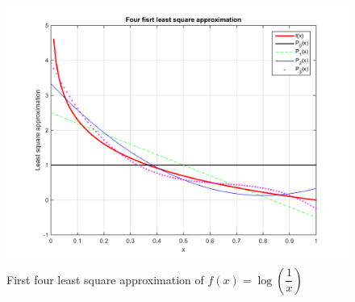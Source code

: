 \documentclass[14pt,a4paper]{article}
\begin{document}
\begin{enumerate}
\begin{figure}[htp]
		\centering
		\includegraphics[scale=0.7]{hw3_34.png}
		\caption{First four least square approximation of $f(x) = \log(\dfrac{1}{x})$}
	\end{figure}
\end{enumerate}
\end{document}
